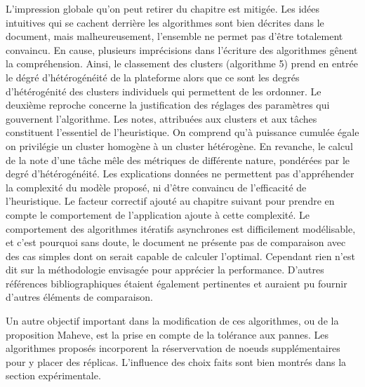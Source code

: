 \documentclass[a4paper,12pt]{article}
\begin{document}
L'impression globale qu'on peut retirer du chapitre est mitigée. Les idées 
intuitives qui se cachent derrière les algorithmes sont bien décrites dans 
le document, mais malheureusement, l'ensemble ne permet pas d'être totalement 
convaincu. En cause, plusieurs imprécisions dans l'écriture des algorithmes
gênent la compréhension. Ainsi, le classement des clusters (algorithme 5)
prend en entrée le dégré d'hétérogénéité de la plateforme alors que ce
sont les degrés d'hétérogénité des clusters individuels qui permettent 
de les ordonner. Le deuxième reproche concerne la justification des réglages
des paramètres qui gouvernent l'algorithme. Les notes, attribuées aux 
clusters et aux tâches constituent l'essentiel de l'heuristique. On comprend 
qu'à puissance cumulée égale on privilégie un cluster homogène à un cluster 
hétérogène. En revanche, le calcul de la note d'une tâche mêle des métriques
de différente nature, pondérées par le 
degré d'hétérogénéité. Les explications données ne permettent pas d'appréhender 
la complexité du modèle proposé, ni d'être convaincu de l'efficacité de 
l'heuristique. Le facteur correctif ajouté au chapitre suivant pour prendre
en compte le comportement de l'application ajoute à cette complexité.
Le comportement des algorithmes itératifs asynchrones est difficilement 
modélisable, et c'est pourquoi sans doute, le document ne présente pas
de comparaison avec des cas simples dont on serait capable de calculer 
l'optimal. Cependant rien n'est dit sur la méthodologie envisagée pour
apprécier la performance. D'autres références bibliographiques étaient 
également pertinentes et auraient pu fournir d'autres éléments de comparaison.
 
Un autre objectif important dans la modification de ces algorithmes, ou de 
la proposition Maheve, est la prise en compte de la tolérance aux pannes.
Les algorithmes proposés incorporent la réservervation de noeuds supplémentaires
pour y placer des réplicas. L'influence des choix faits sont bien montrés dans
la section expérimentale.


\end{document}
